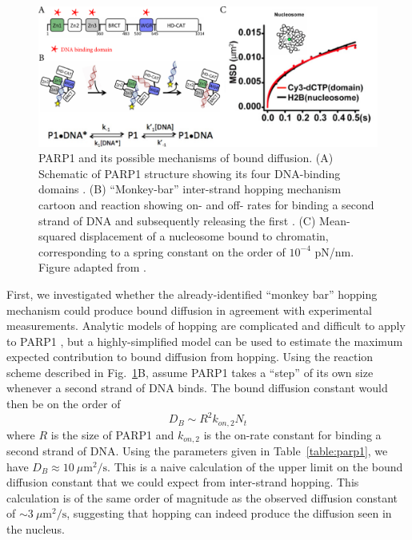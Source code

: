 \begin{figure}[t!]
\centering
\includegraphics[width=0.8\linewidth]{figs/ch02/PARP1.pdf}
\caption[Possible bound-diffusion mechanisms of PARP1.]{PARP1 and its possible mechanisms of bound diffusion. (A) Schematic of PARP1 structure showing its four DNA-binding domains \cite{rudolph18}. (B) ``Monkey-bar'' inter-strand hopping mechanism cartoon and reaction showing on- and off- rates for binding a second strand of DNA and subsequently releasing the first \cite{rudolph18}.  (C) Mean-squared displacement of a nucleosome bound to chromatin, corresponding to a spring constant on the order of $10^{-4}$ pN/nm.  Figure adapted from \cite{nozaki17}.}
\label{fig:parp1}
\end{figure}

First, we investigated whether the already-identified ``monkey bar'' hopping mechanism could produce bound diffusion in agreement with experimental measurements.   Analytic models of hopping are complicated and difficult to apply to PARP1 \cite{yang18}, but a highly-simplified model can be used to estimate the maximum expected contribution to bound diffusion from hopping.   Using the reaction scheme described in Fig.~\ref{fig:parp1}B, assume PARP1 takes a ``step'' of its own size whenever a second strand of DNA binds.  The bound diffusion constant would then be on the order of $$D_B \sim R^2 k_{on,2} N_t$$ where $R$ is the size of PARP1 and $k_{on,2}$ is the on-rate constant for binding a second strand of DNA.  Using the parameters given in Table~\ref{table:parp1}, we have $D_B \approx 10\ \mu\mathrm{m}^2/\mathrm{s}$.  This is a naive calculation of the upper limit on the bound diffusion constant that we could expect from inter-strand hopping.  This calculation is of the same order of magnitude as the observed diffusion constant of $\sim 3\ \mu\mathrm{m}^2/\mathrm{s}$, suggesting that hopping can indeed produce the diffusion seen in the nucleus.


